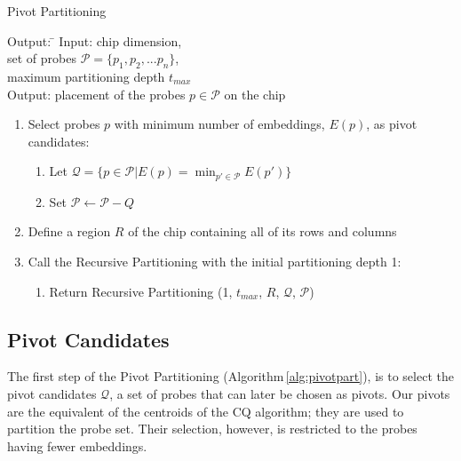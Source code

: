 \documentclass{llncs}
\begin{document}
\begin{algorithm}
\caption{Pivot Partitioning}
\label{alg:pivotpart}
\begin{minipage}{4.8in}

\begin{tabbing}
Output: \=                                  \kill
Input:  \> chip dimension,                          \\
        \> set of probes $\mathcal{P} = \{p_{1}, p_{2}, ... p_{n}\}$,       \\
        \> maximum partitioning depth $t_{max}$                 \\
Output: \> placement of the probes $p \in \mathcal{P}$ on the chip
\end{tabbing}

\begin{enumerate}
\item Select probes $p$ with minimum number of embeddings, $E(p)$,
as pivot candidates:
  \begin{enumerate}
  \item Let $\mathcal{Q} = \{p \in \mathcal{P} | E(p) = \min_{p' \in \mathcal{P}} E(p')\}$
  \item Set $\mathcal{P} \leftarrow \mathcal{P} - Q$
  \end{enumerate}
\item Define a region $R$ of the chip containing all of its rows and columns
\item Call the Recursive Partitioning with the initial partitioning depth 1:
  \begin{enumerate}
  \item Return Recursive Partitioning (1, $t_{max}$, $R$, $\mathcal{Q}$, $\mathcal{P}$)
  \end{enumerate}
\end{enumerate}

\end{minipage}
\end{algorithm}

\subsection{Pivot Candidates}

The first step of the Pivot Partitioning (Algorithm\,\ref{alg:pivotpart}), is to
select the pivot candidates $\mathcal{Q}$, a set of probes that can later be
chosen as pivots. Our pivots are the equivalent of the centroids of the CQ
algorithm; they are used to partition the probe set. Their
selection, however, is restricted to the probes having fewer embeddings.
\end{document}
